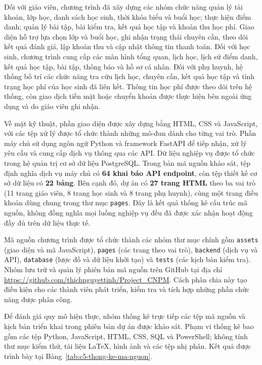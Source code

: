 Đối với giáo viên, chương trình đã xây dựng các nhóm chức năng quản lý tài khoản, lớp học, danh sách học sinh, thời khóa biểu và buổi học; thực hiện điểm danh; quản lý bài tập, bài kiểm tra, kết quả học tập và khoản thu học phí. Giao diện hỗ trợ lựa chọn lớp và buổi học, ghi nhận trạng thái chuyên cần, theo dõi kết quả đánh giá, lập khoản thu và cập nhật thông tin thanh toán. Đối với học sinh, chương trình cung cấp các màn hình tổng quan, lịch học, lịch sử điểm danh, kết quả học tập, bài tập, thông báo và hồ sơ cá nhân. Đối với phụ huynh, hệ thống bố trí các chức năng tra cứu lịch học, chuyên cần, kết quả học tập và tình trạng học phí của học sinh đã liên kết. Thông tin học phí được theo dõi trên hệ thống, còn giao dịch tiền mặt hoặc chuyển khoản được thực hiện bên ngoài ứng dụng và do giáo viên ghi nhận.

Về mặt kỹ thuật, phần giao diện được xây dựng bằng HTML, CSS và JavaScript, với các tệp xử lý được tổ chức thành những mô-đun dành cho từng vai trò. Phần máy chủ sử dụng ngôn ngữ Python và framework FastAPI để tiếp nhận, xử lý yêu cầu và cung cấp dịch vụ thông qua các API. Dữ liệu nghiệp vụ được tổ chức trong hệ quản trị cơ sở dữ liệu PostgreSQL. Trong bản mã nguồn khảo sát, tệp định nghĩa dịch vụ máy chủ có \textbf{64 khai báo API endpoint}, còn tệp thiết kế cơ sở dữ liệu có \textbf{22 bảng}. Bên cạnh đó, dự án có \textbf{27 trang HTML} theo ba vai trò (11 trang giáo viên, 8 trang học sinh và 8 trang phụ huynh), cùng một trang điều khoản dùng chung trong thư mục \texttt{pages}. Đây là kết quả thống kê cấu trúc mã nguồn, không đồng nghĩa mọi luồng nghiệp vụ đều đã được xác nhận hoạt động đầy đủ trên dữ liệu thực tế.

Mã nguồn chương trình được tổ chức thành các nhóm thư mục chính gồm \texttt{assets} (giao diện và mã JavaScript), \texttt{pages} (các trang theo vai trò), \texttt{backend} (dịch vụ và API), \texttt{database} (lược đồ và dữ liệu khởi tạo) và \texttt{tests} (các kịch bản kiểm tra). Nhóm lưu trữ và quản lý phiên bản mã nguồn trên GitHub tại địa chỉ \url{https://github.com/thichnguyettinh/Project_CNPM}. Cách phân chia này tạo điều kiện cho các thành viên phát triển, kiểm tra và tích hợp những phần chức năng được phân công.

Để đánh giá quy mô hiện thực, nhóm thống kê trực tiếp các tệp mã nguồn và kịch bản triển khai trong phiên bản dự án được khảo sát. Phạm vi thống kê bao gồm các tệp Python, JavaScript, HTML, CSS, SQL và PowerShell; không tính thư mục kiểm thử, tài liệu LaTeX, hình ảnh và các tệp nhị phân. Kết quả được trình bày tại Bảng~\ref{tab:c5-thong-ke-ma-nguon}.

